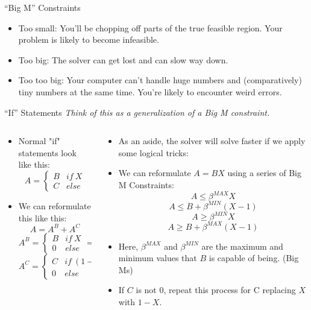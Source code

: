 \documentclass[10pt, aspectratio=169]{beamer}
\begin{document}
\begin{frame}{\enquote{Big M} Constraints}
\begin{itemize}
        \begin{itemize}
            \item Too small: You'll be chopping off parts of the true feasible region. Your problem is likely to become infeasible.
            \item Too big: The solver can get lost and can slow way down.
            \item Too too big: Your computer can't handle huge numbers and (comparatively) tiny numbers at the same time. You're likely to encounter weird errors.
        \end{itemize}
    \end{itemize}
\end{frame}

\begin{frame}{\enquote{If} Statements}
    \textit{Think of this as a generalization of a Big M constraint.}
    \begin{columns}[t]
        \begin{column}[t]{0.5\textwidth}
            \begin{itemize}
                \item Normal "if" statements look like this:
                $$A = \begin{cases}B & if\ X\\C & else \end{cases}$$
                \item We can reformulate this like this:
                $$A = A^B + A^C$$
                $$A^B = \begin{cases}B & if\ X\\0 & else \end{cases} = BX$$
                $$A^C = \begin{cases}C & if\ (1-X)\\0 & else \end{cases} = C(1-X)$$
            \end{itemize}
        \end{column}
        \begin{column}[t]{0.5\textwidth}
            \begin{itemize}
                \item As an aside, the solver will solve faster if we apply some logical tricks:
                \item We can reformulate $A = BX$ using a series of Big M Constraints:
                $$A \leq \beta^{MAX} X$$
                $$A \leq B + \beta^{MIN}(X-1)$$
                $$A \geq \beta^{MIN}X$$
                $$A \geq B + \beta^{MAX}(X-1)$$
                \item Here, $\beta^{MAX}$ and $\beta^{MIN}$ are the maximum and minimum values that $B$ is capable of being. (Big Ms)
                \item If $C$ is not 0, repeat this process for C replacing $X$ with $1-X$.
            \end{itemize}
        \end{column}
    \end{columns}
\end{frame}
\end{document}
